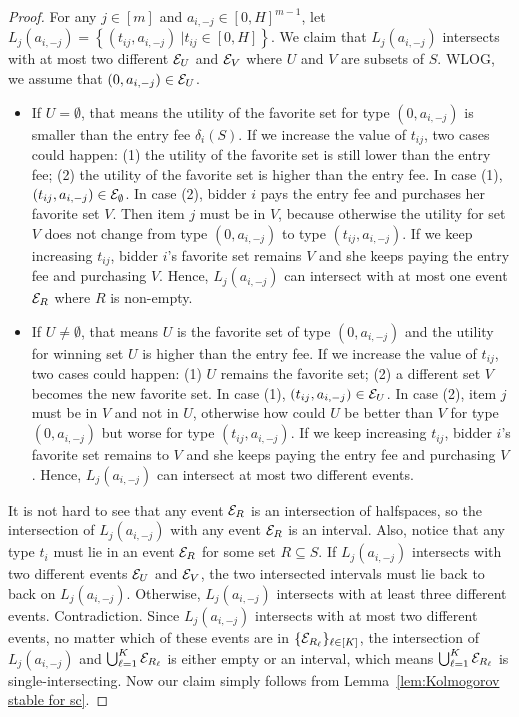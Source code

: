 {{\begin{proof}
	For any $j\in[m]$ and $a_{i,-j}\in [0,H]^{{m}-1}$, let $L_j(a_{i,-j})=\left\{ (t_{ij},a_{i,-j}) \ | t_{ij}\in [0,H] \right\}$. We claim that $L_j(a_{i,-j})$ intersects with at most two different ${\mathcal{E}}_{U}$ and ${\mathcal{E}}_{V}$ where $U$ and $V$ are subsets of $S$. 
	WLOG, we assume that  $(0,a_{i,-j})\in {\mathcal{E}}_U$. 
	\begin{itemize}
		\item If $U=\emptyset$, that means the utility of the favorite set for type $(0,a_{i,-j})$ is smaller than the entry fee $\delta_i(S)$. If we increase the value of $t_{ij}$, two cases could happen: (1) the utility of the favorite set is still lower than the entry fee; (2) the utility of the favorite set is higher than the entry fee. In case (1), $(t_{ij},a_{i,-j})\in {\mathcal{E}}_{\emptyset}$. In case (2), bidder $i$ pays the entry fee and purchases her favorite set $V$. Then item $j$ must be in $V$, because otherwise the utility for set $V$ does not change from type $(0,a_{i,-j})$ to type $(t_{ij},a_{i,-j})$. If we keep increasing $t_{ij}$, bidder $i$'s favorite set remains $V$ and she keeps paying the entry fee and purchasing $V$. Hence, $L_j(a_{i,-j})$ can intersect with at most one event ${\mathcal{E}}_R$ where $R$ is non-empty.
		\item If $U\neq \emptyset$, that means $U$ is the favorite set of type $(0,a_{i,-j})$ and the utility for winning set $U$ is higher than the entry fee.  If we increase the value of $t_{ij}$, two cases could happen: (1) $U$ remains the favorite set; (2) a different set $V$ becomes the new favorite set. In case (1), $(t_{ij},a_{i,-j})\in {\mathcal{E}}_U$. In case (2), item $j$ must be in $V$ and not in $U$, otherwise how could $U$ be better than $V$ for type $(0,a_{i,-j})$ but worse for type $(t_{ij},a_{i,-j})$.  If we keep increasing $t_{ij}$, bidder $i$'s favorite set remains to $V$ and she keeps paying the entry fee and purchasing $V$. Hence, $L_j(a_{i,-j})$ can intersect at most two different events.
	\end{itemize}
	
It is not hard to see that any event ${\mathcal{E}}_R$ is an intersection of halfspaces, so the intersection of $L_j(a_{i,-j})$ with any event ${\mathcal{E}}_R$ is an interval. {Also, notice that any type $t_i$ must lie in an event ${\mathcal{E}}_R$ for some set $R\subseteq S$.} If $L_j(a_{i,-j})$ intersects with two different events ${\mathcal{E}}_U$ and ${\mathcal{E}}_V$, the two intersected intervals must lie back to back on $L_j(a_{i,-j})$. Otherwise, $L_j(a_{i,-j})$ intersects with at least three different events. Contradiction. Since $L_j(a_{i,-j})$ intersects with at most two different events, no matter which of these events are in $\{{\mathcal{E}}_{R_\ell}\}_{\ell\in[K]}$, the intersection of $L_j(a_{i,-j})$ and $\bigcup_{\ell=1}^K {\mathcal{E}}_{R_\ell}$ is either empty or an interval,%
  which means $\bigcup_{\ell=1}^K {\mathcal{E}}_{R_\ell}$ is single-intersecting. Now our claim simply follows from Lemma~\ref{lem:Kolmogorov stable for sc}.
\end{proof}
}

}
